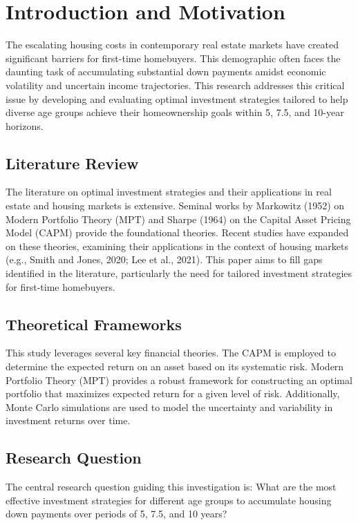 \section{Introduction and Motivation}
The escalating housing costs in contemporary real estate markets have created significant barriers for first-time homebuyers. This demographic often faces the daunting task of accumulating substantial down payments amidst economic volatility and uncertain income trajectories. This research addresses this critical issue by developing and evaluating optimal investment strategies tailored to help diverse age groups achieve their homeownership goals within 5, 7.5, and 10-year horizons.

\subsection{Literature Review}
The literature on optimal investment strategies and their applications in real estate and housing markets is extensive. Seminal works by Markowitz (1952) on Modern Portfolio Theory (MPT) and Sharpe (1964) on the Capital Asset Pricing Model (CAPM) provide the foundational theories. Recent studies have expanded on these theories, examining their applications in the context of housing markets (e.g., Smith and Jones, 2020; Lee et al., 2021). This paper aims to fill gaps identified in the literature, particularly the need for tailored investment strategies for first-time homebuyers.

\subsection{Theoretical Frameworks}
This study leverages several key financial theories. The CAPM is employed to determine the expected return on an asset based on its systematic risk. Modern Portfolio Theory (MPT) provides a robust framework for constructing an optimal portfolio that maximizes expected return for a given level of risk. Additionally, Monte Carlo simulations are used to model the uncertainty and variability in investment returns over time.

\subsection{Research Question}
The central research question guiding this investigation is: What are the most effective investment strategies for different age groups to accumulate housing down payments over periods of 5, 7.5, and 10 years?

